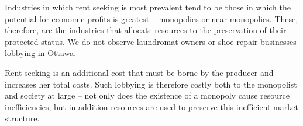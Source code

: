 Industries in which rent seeking is most prevalent tend to be those in which the potential for economic profits is greatest -- monopolies or near-monopolies. These, therefore, are the industries that allocate resources to the preservation of their protected status. We do not observe laundromat owners or shoe-repair businesses lobbying in Ottawa. 

Rent seeking is an additional cost that must be borne by the producer and increases her total costs. Such lobbying is therefore costly both to the monopolist and society at large -- not only does the existence of a monopoly cause resource inefficiencies, but in addition resources are used to preserve this inefficient market structure.